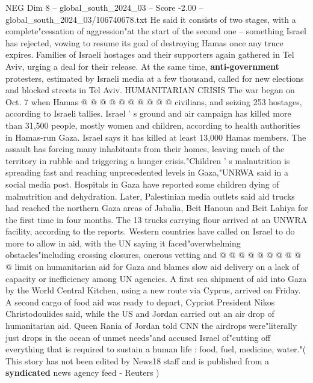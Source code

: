 \begin{textsample}{NEG Dim 8 – global\_south\_2024\_03 – Score -2.00 – global\_south\_2024\_03/106740678.txt}
He said it consists of two stages, with a complete"cessation of aggression"at the start of the second one -- something Israel has rejected, vowing to resume its goal of destroying Hamas once any truce expires.
Families of Israeli hostages and their supporters again gathered in Tel Aviv, urging a deal for their release.
At the same time, \textbf{anti-government} protesters, estimated by Israeli media at a few thousand, called for new elections and blocked streets in Tel Aviv.
HUMANITARIAN CRISIS The war began on Oct. 7 when Hamas @ @ @ @ @ @ @ @ @ @ civilians, and seizing 253 hostages, according to Israeli tallies.
Israel ' s ground and air campaign has killed more than 31,500 people, mostly women and children, according to health authorities in Hamas-run Gaza.
Israel says it has killed at least 13,000 Hamas members.
The assault has forcing many inhabitants from their homes, leaving much of the territory in rubble and triggering a hunger crisis."Children ' s malnutrition is spreading fast and reaching unprecedented levels in Gaza,"UNRWA said in a social media post.
Hospitals in Gaza have reported some children dying of malnutrition and dehydration.
Later, Palestinian media outlets said aid trucks had reached the northern Gaza areas of Jabalia, Beit Hanoun and Beit Lahiya for the first time in four months.
The 13 trucks carrying flour arrived at an UNWRA facility, according to the reports.
Western countries have called on Israel to do more to allow in aid, with the UN saying it faced"overwhelming obstacles"including crossing closures, onerous vetting and @ @ @ @ @ @ @ @ @ @ limit on humanitarian aid for Gaza and blames slow aid delivery on a lack of capacity or inefficiency among UN agencies.
A first sea shipment of aid into Gaza by the World Central Kitchen, using a new route via Cyprus, arrived on Friday.
A second cargo of food aid was ready to depart, Cypriot President Nikos Christodoulides said, while the US and Jordan carried out an air drop of humanitarian aid.
Queen Rania of Jordan told CNN the airdrops were"literally just drops in the ocean of unmet needs"and accused Israel of"cutting off everything that is required to sustain a human life : food, fuel, medicine, water."( This story has not been edited by News18 staff and is published from a \textbf{syndicated} news agency feed - Reuters )

\end{textsample}
